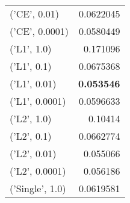 \begin{tabular}{lr}
 ('CE', 0.01)    &   0.0622045 \\
 ('CE', 0.0001)  &   0.0580449 \\
 ('L1', 1.0)     &   0.171096  \\
 ('L1', 0.1)     &   0.0675368 \\
 ('L1', 0.01)    &   {\bf 0.053546}  \\
 ('L1', 0.0001)  &   0.0596633 \\
 ('L2', 1.0)     &   0.10414   \\
 ('L2', 0.1)     &   0.0662774 \\
 ('L2', 0.01)    &   0.055066  \\
 ('L2', 0.0001)  &   0.056186  \\
 ('Single', 1.0) &   0.0619581 \\
\hline
\end{tabular}